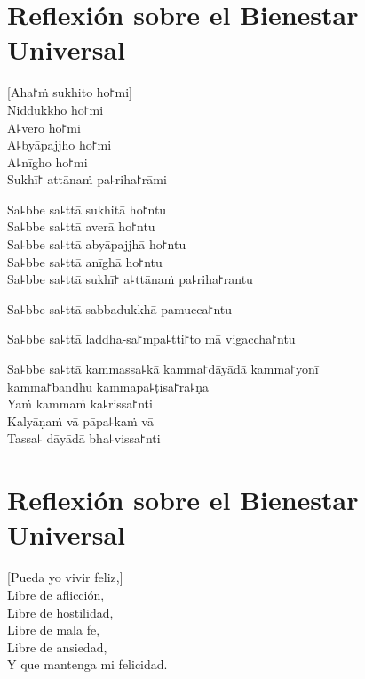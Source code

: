 \chapter*[Bienestar Universal]{Reflexión sobre el Bienestar Universal}

\delegateSetUseNext


\begin{leader}
\end{leader}

[Aha꜓ṁ sukhito ho꜓mi]\\
Niddukkho ho꜓mi\\
A꜕vero ho꜓mi\\
A꜕byāpajjho ho꜓mi\\
A꜕nīgho ho꜓mi\\
Sukhī꜓ attānaṁ pa꜕riha꜓rāmi

Sa꜕bbe sa꜕ttā sukhitā ho꜓ntu\\
Sa꜕bbe sa꜕ttā averā ho꜓ntu\\
Sa꜕bbe sa꜕ttā abyāpajjhā ho꜓ntu\\
Sa꜕bbe sa꜕ttā anīghā ho꜓ntu\\
Sa꜕bbe sa꜕ttā sukhī꜓ a꜕ttānaṁ pa꜕riha꜓rantu

Sa꜕bbe sa꜕ttā sabbadukkhā pamucca꜓ntu

Sa꜕bbe sa꜕ttā laddha-sa꜓mpa꜕tti꜓to mā vigaccha꜓ntu

Sa꜕bbe sa꜕ttā kammassa꜕kā kamma꜓dāyādā kamma꜓yonī\\
\vin kamma꜓bandhū kammapa꜕ṭisa꜓ra꜕ṇā\\
Yaṁ kammaṁ ka꜕rissa꜓nti\\
Kalyāṇaṁ vā pāpa꜕kaṁ vā\\
Tassa꜕ dāyādā bha꜕vissa꜓nti

\chapter[Bienestar Universal]{Reflexión sobre el Bienestar Universal}


\begin{leader}
\end{leader}

[Pueda yo vivir feliz,]\\
Libre de aflicción,\\
Libre de hostilidad,\\
Libre de mala fe,\\
Libre de ansiedad,\\
Y que mantenga mi felicidad.

